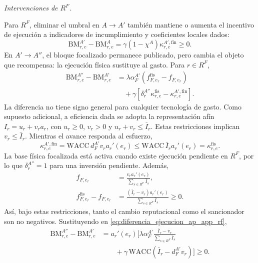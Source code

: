 \medskip
\noindent\textbullet\enspace\textit{Intervenciones de \(R^{F}\).}
\par\smallskip

Para \(R^{F}\), eliminar el umbral en \(A\to A'\) también mantiene o aumenta el incentivo de ejecución a indicadores de incumplimiento y coeficientes locales dados:
\begin{equation}
\label{eq:diferencia_ejecucion_a_ap_rf}
\mathrm{BM}_{r,e}^{A'}-\mathrm{BM}_{r,e}^{A}
=\gamma(1-\chi^A)\kappa_{r,e}^{A',\mathrm{fin}}\geq0.
\end{equation}
En \(A'\to A''\), el bloque focalizado permanece publicado, pero cambia el objeto que recompensa: la ejecución física sustituye al gasto. Para \(r\in R^F\),
\begin{equation}
\label{eq:diferencia_ejecucion_ap_app_rf}
\begin{aligned}
\mathrm{BM}_{r,e}^{A''}-\mathrm{BM}_{r,e}^{A'}
&=\lambda\alpha_F^{A'}
\left(f_{F,e_r}^{\mathrm{fis}}-f_{F,e_r}\right)
\\
&\quad+\gamma\left[
\delta_r^{A''}\kappa_{r,e}^{\mathrm{fis}}
-\kappa_{r,e}^{A',\mathrm{fin}}\right].
\end{aligned}
\end{equation}
La diferencia no tiene signo general para cualquier tecnología de gasto. Como supuesto adicional, a eficiencia dada se adopta la representación afín \(I_r=u_r+v_ra_r\), con \(u_r\geq0\), \(v_r>0\) y \(u_r+v_r\leq\bar I_r\). Estas restricciones implican \(v_r\leq\bar I_r\). Mientras el avance responda al esfuerzo,
\begin{equation}
\label{eq:cota_canal_financiero_rf}
\kappa_{r,e}^{A',\mathrm{fin}}
=\mathrm{WACC}\,d_F^{A'}v_ra_r'(e_r)
\leq\mathrm{WACC}\,\bar I_ra_r'(e_r)
=\kappa_{r,e}^{\mathrm{fis}}.
\end{equation}
La base física focalizada está activa cuando existe ejecución pendiente en \(R^F\), por lo que \(\delta_r^{A''}=1\) para una inversión pendiente. Además,
\begin{equation}
\label{eq:derivada_financiera_afin_rf}
\begin{aligned}
f_{F,e_r}&=\frac{v_ra_r'(e_r)}{\sum_{s\in R^F}\bar I_s},\\
f_{F,e_r}^{\mathrm{fis}}-f_{F,e_r}
&=\frac{(\bar I_r-v_r)a_r'(e_r)}{\sum_{s\in R^F}\bar I_s}\geq0.
\end{aligned}
\end{equation}
Así, bajo estas restricciones, tanto el cambio reputacional como el sancionador son no negativos. Sustituyendo en \eqref{eq:diferencia_ejecucion_ap_app_rf},
\begin{equation}
\label{eq:condicion_ejecucion_rf_ap_app}
\begin{aligned}
\mathrm{BM}_{r,e}^{A''}-\mathrm{BM}_{r,e}^{A'}
&=a_r'(e_r)\Biggl[
\lambda\alpha_F^{A'}\frac{\bar I_r-v_r}{\sum_{s\in R^F}\bar I_s}
\\
&\qquad+\gamma\,\mathrm{WACC}
\left(\bar I_r-d_F^{A'}v_r\right)\Biggr]\geq0.
\end{aligned}
\end{equation}

